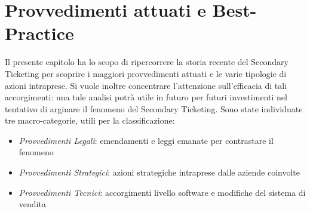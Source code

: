\chapter{Provvedimenti attuati e Best-Practice}
\label{chap:best_p}

Il presente capitolo ha lo scopo di ripercorrere la storia recente del Secondary Ticketing per scoprire i maggiori provvedimenti attuati e le varie tipologie di azioni intraprese. 
Si vuole inoltre concentrare l'attenzione sull'efficacia di tali accorgimenti: una tale analisi potrà utile in futuro per futuri investimenti nel tentativo di arginare il fenomeno del Secondary Ticketing. 
Sono state individuate tre macro-categorie, utili per la classificazione: 
\begin{itemize}
\item \textit{Provvedimenti Legali}: emendamenti e leggi emanate per contrastare il fenomeno
\item \textit{Provvedimenti Strategici}: azioni strategiche intraprese dalle aziende coinvolte
\item \textit{Provvedimenti Tecnici}: accorgimenti livello software e modifiche del sistema di vendita
\end{itemize}

